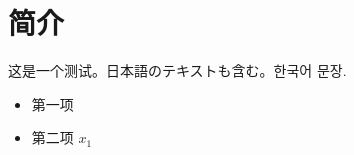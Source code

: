 \documentclass{ctexart}
\begin{document}
\section{简介}
这是一个测试。日本語のテキストも含む。한국어 문장.
\begin{itemize}
\item 第一项
\item 第二项 $x_1$
\end{itemize}
\end{document}
